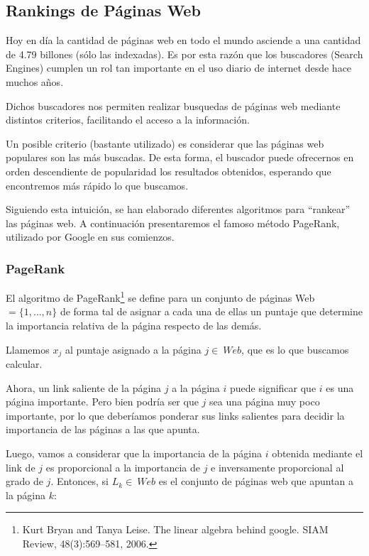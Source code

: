 \subsection{Rankings de Páginas Web}

Hoy en día la cantidad de páginas web en todo el mundo asciende a una cantidad de
4.79 billones (sólo las indexadas). Es por esta razón que los buscadores
(Search Engines) cumplen un rol tan importante en el uso diario de internet desde
hace muchos años.

Dichos buscadores nos permiten realizar busquedas de páginas web mediante distintos
criterios, facilitando el acceso a la información.

Un posible criterio (bastante utilizado) es considerar que las páginas web populares
son las más buscadas. De esta forma, el buscador puede ofrecernos en orden descendiente
de popularidad los resultados obtenidos, esperando que encontremos más rápido lo
 que buscamos.

 Siguiendo esta intuición, se han elaborado diferentes algoritmos para ``rankear''
 las páginas web. A continuación presentaremos el famoso método PageRank, utilizado
 por Google en sus comienzos.

\subsubsection{PageRank}\label{PageRank}

El algoritmo de PageRank\footnote{Kurt Bryan and Tanya Leise. The linear algebra
behind google. SIAM Review, 48(3):569–581, 2006.} se define para un conjunto de
páginas Web $ = \{ 1,\dots, n \}$ de forma tal de asignar a cada una de ellas un
 puntaje que determine la importancia relativa de la página respecto de las demás.

Llamemos $x_j$ al puntaje asignado a la página $j\in\ Web$, que es lo que buscamos
calcular.

Ahora, un link saliente de la página $j$ a la página $i$ puede significar que $i$
 es una página importante. Pero bien podría ser que $j$ sea una página muy poco
 importante, por lo que deberíamos ponderar sus links salientes para decidir
 la importancia de las páginas a las que apunta.

Luego, vamos a considerar que la importancia de la página $i$ obtenida mediante el
link de $j$ es proporcional a la importancia de $j$ e inversamente proporcional
al grado de $j$. Entonces, si $L_k \in\ Web$ es el conjunto de páginas web que
apuntan a la página $k$:

